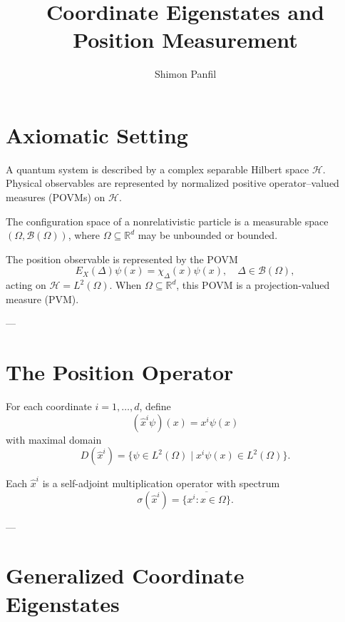 \documentclass[11pt]{article}
\title{Coordinate Eigenstates and Position Measurement}
\author{Shimon Panfil}
\date{}
\begin{document}
\maketitle

\section{Axiomatic Setting}

\begin{axiom}
A quantum system is described by a complex separable Hilbert space $\mathcal H$.
Physical observables are represented by normalized positive operator--valued measures (POVMs) on $\mathcal H$.
\end{axiom}

\begin{axiom}
The configuration space of a nonrelativistic particle is a measurable space $(\Omega,\mathcal B(\Omega))$,
where $\Omega \subseteq \mathbb R^d$ may be unbounded or bounded.
\end{axiom}

\begin{axiom}
The position observable is represented by the POVM
\[
E_X(\Delta)\psi(x) = \chi_\Delta(x)\psi(x),
\quad \Delta \in \mathcal B(\Omega),
\]
acting on $\mathcal H = L^2(\Omega)$.
When $\Omega \subseteq \mathbb R^d$, this POVM is a projection-valued measure (PVM).
\end{axiom}

---

\section{The Position Operator}

\begin{definition}
For each coordinate $i=1,\dots,d$, define
\[
(\hat x^i \psi)(x) = x^i \psi(x)
\]
with maximal domain
\[
D(\hat x^i)=\{\psi\in L^2(\Omega)\mid x^i\psi(x)\in L^2(\Omega)\}.
\]
\end{definition}

\begin{proposition}
Each $\hat x^i$ is a self-adjoint multiplication operator with spectrum
\[
\sigma(\hat x^i)=\overline{\{x^i:x\in\Omega\}}.
\]
\end{proposition}

---

\section{Generalized Coordinate Eigenstates}
\end{document}
